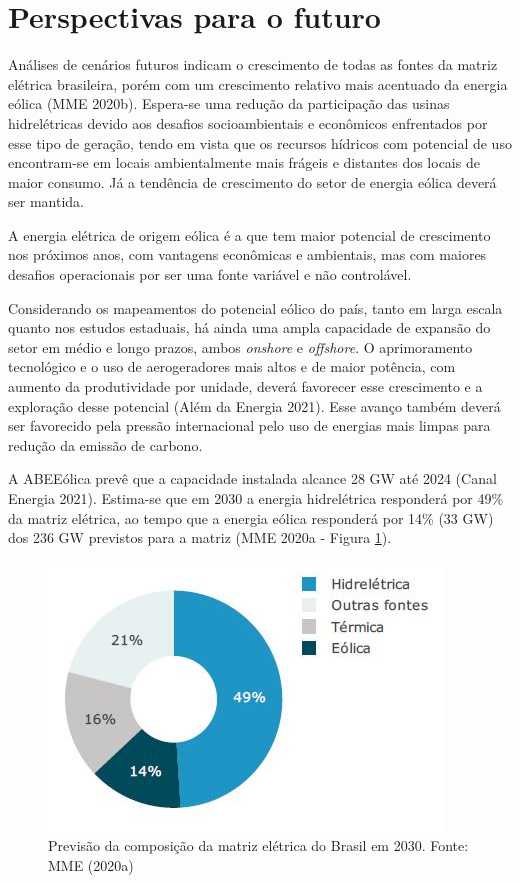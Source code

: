 \documentclass[
  oneside]{scrbook}
\begin{document}
\hypertarget{perspectivas-para-o-futuro}{%
\section{Perspectivas para o futuro}\label{perspectivas-para-o-futuro}}

Análises de cenários futuros indicam o crescimento de todas as fontes da matriz elétrica brasileira, porém com um crescimento relativo mais acentuado da energia eólica (MME 2020b). Espera-se uma redução da participação das usinas hidrelétricas devido aos desafios socioambientais e econômicos enfrentados por esse tipo de geração, tendo em vista que os recursos hídricos com potencial de uso encontram-se em locais ambientalmente mais frágeis e distantes dos locais de maior consumo. Já a tendência de crescimento do setor de energia eólica deverá ser mantida.

A energia elétrica de origem eólica é a que tem maior potencial de crescimento nos próximos anos, com vantagens econômicas e ambientais, mas com maiores desafios operacionais por ser uma fonte variável e não controlável.

Considerando os mapeamentos do potencial eólico do país, tanto em larga escala quanto nos estudos estaduais, há ainda uma ampla capacidade de expansão do setor em médio e longo prazos, ambos \emph{onshore} e \emph{offshore}. O aprimoramento tecnológico e o uso de aerogeradores mais altos e de maior potência, com aumento da produtividade por unidade, deverá favorecer esse crescimento e a exploração desse potencial (Além da Energia 2021). Esse avanço também deverá ser favorecido pela pressão internacional pelo uso de energias mais limpas para redução da emissão de carbono.

A ABEEólica prevê que a capacidade instalada alcance 28 GW até 2024 (Canal Energia 2021). Estima-se que em 2030 a energia hidrelétrica responderá por 49\% da matriz elétrica, ao tempo que a energia eólica responderá por 14\% (33 GW) dos 236 GW previstos para a matriz (MME 2020a - Figura \ref{fig:08}).

\begin{figure}[H]

{\centering \includegraphics[width=0.6\linewidth]{imagens/cap01/Figura_1.8} 

}

\caption{Previsão da composição da matriz elétrica do Brasil em 2030. Fonte: MME (2020a)}\label{fig:08}
\end{figure}
\end{document}
